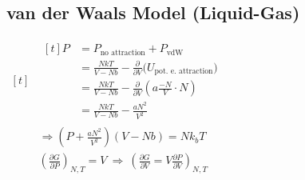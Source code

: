 \documentclass[12pt]{article}
\begin{document}
\subsection{van der Waals Model (Liquid-Gas)}
\vspace{5pt}
\begin{minipage}[t]{.42\textwidth}
    \(\begin{aligned}[t]
        &\begin{aligned}[t]
                P &= P_\text{no attraction} + P_\text{vdW}\\[7pt]
                &= \frac{NkT}{V - Nb} - \frac{\partial}{\partial V} \big( U_\text{pot. e. attraction} \big)\\[5pt]
                &= \frac{NkT}{V - Nb} - \frac{\partial}{\partial V} \left( a \frac{-N}{V} \cdot N \right)\\[5pt]
                &= \frac{NkT}{V - Nb} - \frac{aN^2}{V^2}
            \end{aligned}\\[3pt]
        &\Rightarrow \boxed{ \left( P + \frac{aN^2}{V^2} \right) \left( V - Nb \right) = Nk_b T }\\[20pt]
        &\left( \tfrac{\partial G}{\partial P} \right)_{N,T} = V \ \Rightarrow \ 
            \boxed{ \left( \tfrac{\partial G}{\partial V} = V \tfrac{\partial P}{\partial V} \right)_{N,T} }
    \end{aligned}\)   
\end{minipage}
\end{document}
